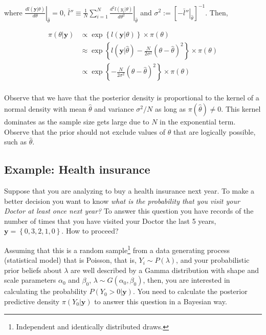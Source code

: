where $\left.\frac{dl(\mathbf{y}|\theta)}{d\theta}\right\vert_{\hat{\theta}}=0$, $\bar{l}''\equiv\frac{1}{N}\left.\sum_{i=1}^N\frac{d^2l(y_i|{\theta})}{d\theta^2}\right\vert_{\hat{\theta}}$ and $\sigma^2:=\left[\left.-\bar{l}''\right\vert_{\hat{\theta}}\right]^{-1}$. Then,

\begin{align*}
	\pi(\theta|\mathbf{y})&\propto \exp\left\{{l}(\mathbf{y}|\theta)\right\} \times \pi(\theta)\\
	&\approx \exp\left\{l(\mathbf{y}|\hat{\theta})-\frac{N}{2\sigma^2}(\theta-\hat{\theta})^2\right\} \times \pi(\theta)\\
	&\propto \exp\left\{-\frac{N}{2\sigma^2}(\theta-\hat{\theta})^2\right\} \times \pi(\theta)\\ 
\end{align*}

Observe that we have that the posterior density is proportional to the kernel of a normal density with mean $\hat{\theta}$ and variance $\sigma^2/N$ as long as $\pi(\hat{\theta})\neq 0$. This kernel dominates as the sample size gets large due to $N$ in the exponential term. Observe that the prior should not exclude values of $\theta$ that are logically possible, such as $\hat{\theta}$.

\subsection{Example: Health insurance}\label{sec121}

Suppose that you are analyzing to buy a health insurance next year. To make a better decision you want to know \textit{what is the probability that you visit your Doctor at least once next year?} To answer this question you have records of the number of times that you have visited your Doctor the last 5 years, $\mathbf{y}=\left\{0, 3, 2, 1, 0\right\}$. How to proceed?

Assuming that this is a random sample\footnote{Independent and identically distributed draws.} from a data generating process (statistical model) that is Poisson, that is, $Y_i\sim P(\lambda)$, and your probabilistic prior beliefs about $\lambda$ are well described by a Gamma distribution with shape and scale parameters $\alpha_0$ and $\beta_0$, $\lambda\sim G(\alpha_0, \beta_0)$, then, you are interested in calculating the probability $P(Y_0>0|\mathbf{y})$. You need to calculate the posterior predictive density $\pi(Y_0|\mathbf{y})$ to answer this question in a Bayesian way.

